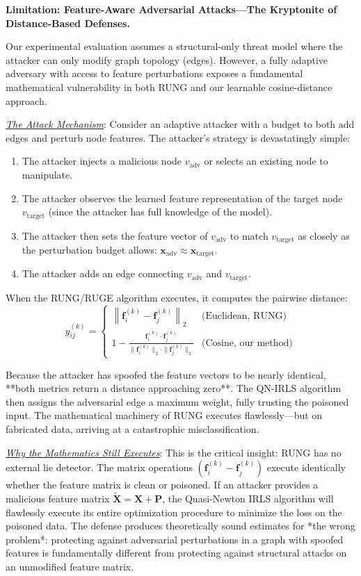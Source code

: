 \documentclass[sigconf]{acmart}
\begin{document}
\textbf{Limitation: Feature-Aware Adversarial Attacks---The Kryptonite of Distance-Based Defenses.} 

Our experimental evaluation assumes a structural-only threat model where the attacker can only modify graph topology (edges). However, a fully adaptive adversary with access to feature perturbations exposes a fundamental mathematical vulnerability in both RUNG and our learnable cosine-distance approach.

\underline{\textit{The Attack Mechanism}}: Consider an adaptive attacker with a budget to both add edges and perturb node features. The attacker's strategy is devastatingly simple:

\begin{enumerate}
\item The attacker injects a malicious node $v_{\text{adv}}$ or selects an existing node to manipulate.
\item The attacker observes the learned feature representation of the target node $v_{\text{target}}$ (since the attacker has full knowledge of the model).
\item The attacker then sets the feature vector of $v_{\text{adv}}$ to match $v_{\text{target}}$ as closely as the perturbation budget allows: $\mathbf{x}_{\text{adv}} \approx \mathbf{x}_{\text{target}}$.
\item The attacker adds an edge connecting $v_{\text{adv}}$ and $v_{\text{target}}$.
\end{enumerate}

When the RUNG/RUGE algorithm executes, it computes the pairwise distance:
$$y^{(k)}_{ij} = \begin{cases} 
\left\lVert \mathbf{f}^{(k)}_i - \mathbf{f}^{(k)}_j \right\rVert_2 & \text{(Euclidean, RUNG)} \\
1 - \frac{\mathbf{f}^{(k)}_i \cdot \mathbf{f}^{(k)}_j}{\|\mathbf{f}^{(k)}_i\|_2 \cdot \|\mathbf{f}^{(k)}_j\|_2} & \text{(Cosine, our method)}
\end{cases}$$

Because the attacker has spoofed the feature vectors to be nearly identical, **both metrics return a distance approaching zero**. The QN-IRLS algorithm then assigns the adversarial edge a maximum weight, fully trusting the poisoned input. The mathematical machinery of RUNG executes flawlessly—but on fabricated data, arriving at a catastrophic misclassification.

\underline{\textit{Why the Mathematics Still Executes}}: This is the critical insight: RUNG has no external lie detector. The matrix operations $(\mathbf{f}^{(k)}_i - \mathbf{f}^{(k)}_j)$ execute identically whether the feature matrix is clean or poisoned. If an attacker provides a malicious feature matrix $\tilde{\mathbf{X}} = \mathbf{X} + \mathbf{P}$, the Quasi-Newton IRLS algorithm will flawlessly execute its entire optimization procedure to minimize the loss on the poisoned data. The defense produces theoretically sound estimates for *the wrong problem*: protecting against adversarial perturbations in a graph with spoofed features is fundamentally different from protecting against structural attacks on an unmodified feature matrix.
\end{document}
